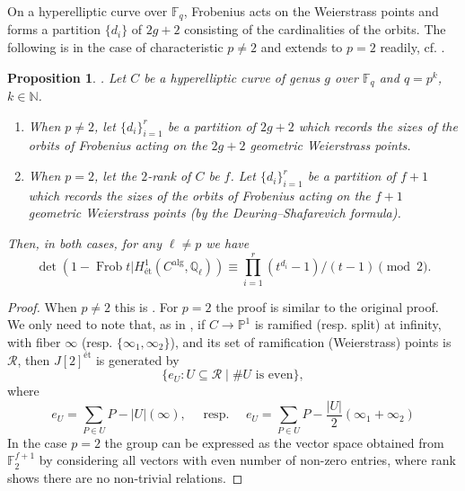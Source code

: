 \documentclass[12pt]{amsart}
\newcommand{\F}{\mathbb{F}}
\newcommand{\N}{\mathbb{N}}
\renewcommand{\P}{\mathbb{P}}
\newcommand{\Q}{\mathbb{Q}}
\newcommand{\calR}{\mathcal{R}}
\DeclareMathOperator{\alg}{alg}
\DeclareMathOperator{\Frob}{Frob}
\numberwithin{equation}{subsection}
\theoremstyle{plain}\newtheorem{ithm}{Theorem}
\theoremstyle{plain}\newtheorem{iprop}[ithm]{Proposition}
\newtheorem{proposition}[equation]{Proposition}
\theoremstyle{definition}
\theoremstyle{remark}
\begin{document}
On a hyperelliptic curve over $\F_q$, Frobenius acts on the Weierstrass points and forms a partition $\{d_i\}$ of $2g+2$ consisting of the cardinalities of the orbits. 
The following is \cite[Proposition 2.4]{CostaWeilPolys} in the case of characteristic $p \neq 2$ and extends to $p = 2$ readily, cf. \cite[Remark~2.6]{CostaWeilPolys}.
\begin{proposition}{\cite[Proposition 2.4]{CostaWeilPolys}. }
Let $C$ be a hyperelliptic curve of genus $g$ over $\F_q$ and $q= p^k$, $k \in \N$.
\begin{enumerate}
\item When $p\neq 2$, let $\{d_i\}_{i = 1}^r$ be a partition of $2g+2$ which records the sizes of the orbits of Frobenius acting on the $2g+2$ geometric Weierstrass points. 

\item When $p = 2$,  let the  $2$-rank of $C$ be $f$. Let $\{d_i\}_{i=1}^r$ be a partition of $f+1$ which records the sizes of the orbits of Frobenius acting on the $f + 1$ geometric Weierstrass points (by the Deuring--Shafarevich formula).
    \end{enumerate}
Then, in both cases, for any $\ell \neq p$  we have
    \begin{equation}
    \label{eq:admissibleweil}
    \det (1 - \Frob t | H^1_{\text{{\'e}t}}(C^{\alg}, \Q_{\ell})) \equiv 
    \prod_{i=1}^r (t^{d_i} - 1) / (t - 1) \pmod 2.
    \end{equation}
\end{proposition}

\begin{proof}
    When $p \neq 2$ this is \cite[Proposition 2.4]{CostaWeilPolys}. 
    For $p = 2$ the proof is similar to the original proof. 
    We only need to note that, as in \cite[Lemma 2.2]{CostaWeilPolys}, if $C\to \P^1$ is ramified (resp. split) at infinity, with fiber $\infty$ (resp. $\{ \infty_1, \infty_2 \}$), and its set of ramification (Weierstrass) points is $\calR$, then $J[2]^{\text{{\'e}t}}$  is generated by 
    $$
    \{ e_U : U \subseteq \calR \mid \#U \text{ is even} \},
    $$
    where
    \[ e_U = \sum_{P \in U} P - |U| (\infty),  \quad \text{ resp. }  \quad e_U = \sum_{P \in U} P - \frac{|U|}{2} (\infty_1+ \infty_2)\]
    In the case $p = 2$ the group can be expressed as the vector space obtained from $\F_2^{f+1}$ by considering all vectors with even number of non-zero entries, where rank shows there are no non-trivial relations. 
\end{proof}
\end{document}
